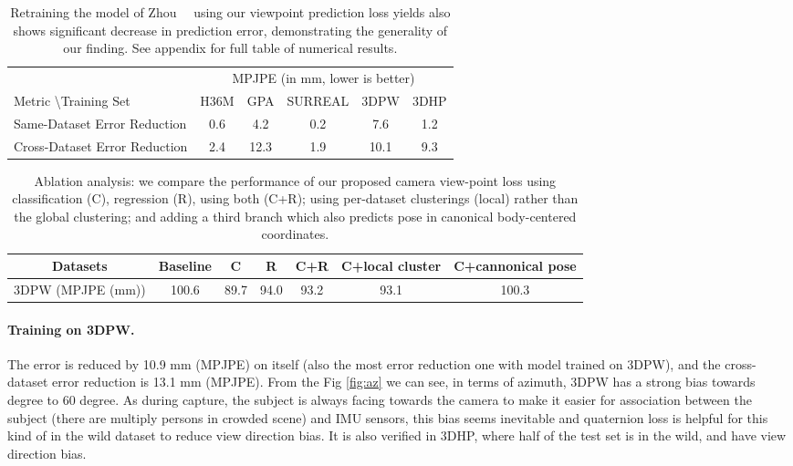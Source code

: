 \documentclass[runningheads]{llncs}
\begin{document}
\begin{table}[t]
\begin{center}
{\scriptsize
\begin{tabular}{@{}l c c c c c@{}}
\toprule
 & \multicolumn{5}{c}{MPJPE (in mm, lower is better)}  \\
Metric \textbackslash Training Set & H36M & GPA & SURREAL & 3DPW & 3DHP \\
\hline
Same-Dataset Error Reduction  & 0.6 & 4.2        & 0.2 & 7.6 & 1.2 \\
Cross-Dataset Error Reduction   & 2.4 & 12.3 & 1.9 & 10.1 &  9.3 \\
\bottomrule
\end{tabular}}
\end{center}
\caption{Retraining the model of Zhou~\etal~\cite{Zhou_2017_ICCV} using our viewpoint prediction
loss yields also shows significant decrease in prediction error, demonstrating the generality of
our finding. See appendix for full table of numerical results.}
\label{tab:secondmethod}
\vspace{-0.15in}
\end{table}




\begin{table}[t]
\begin{center}
\centering
{\scriptsize
\begin{tabular}{ c c c c c c c}
\toprule
Datasets & Baseline & C & R & C+R & C+local cluster & C+cannonical pose      \\
\hline
3DPW (MPJPE (mm)) & 100.6 & 89.7 & 94.0 & 93.2 & 93.1 & 100.3   \\
\bottomrule
\end{tabular}
}
\end{center}
\caption{Ablation analysis: we compare the performance of our proposed camera
view-point loss using classification (C), regression (R), using both (C+R);
using per-dataset clusterings (local) rather than the global clustering; and
adding a third branch which also predicts pose in canonical body-centered
coordinates.}
\label{tab:ablationstudy}
\vspace{-0.15in}
\end{table}


\paragraph{Training on 3DPW.} The error is reduced by 10.9 mm (MPJPE) on itself
(also the most error reduction one with model trained on 3DPW), and the cross-dataset
error reduction is 13.1 mm (MPJPE). From the Fig \ref{fig:az} we can see, in
terms of azimuth, 3DPW has a strong bias towards  degree to 60 degree. As
during capture, the subject is always facing towards the camera to make it
easier for association between  the subject (there are multiply persons in
crowded scene) and IMU sensors, this bias seems inevitable and quaternion loss
is helpful for this kind of in the wild dataset to reduce view direction bias.
It is also verified in 3DHP, where half of the test set is in the wild, and
have view direction bias. 
\end{document}
